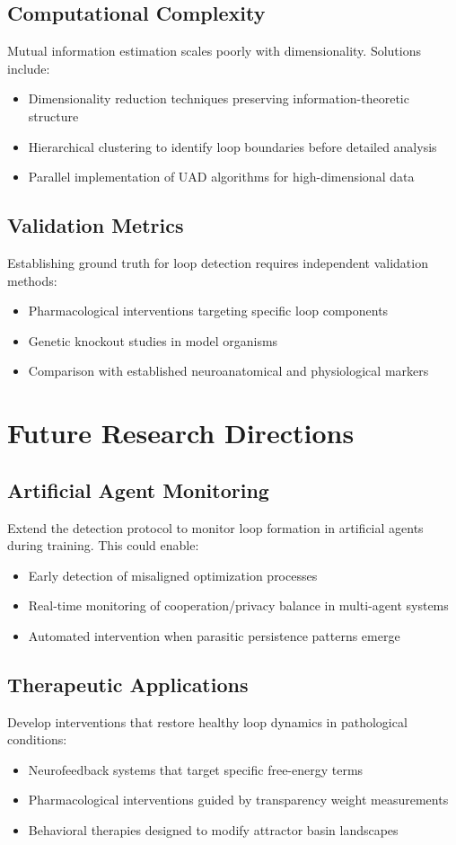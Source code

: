 \documentclass[10pt,conference]{IEEEtran}
\begin{document}
\subsection{Computational Complexity}
Mutual information estimation scales poorly with dimensionality. Solutions include:
\begin{itemize}
\item Dimensionality reduction techniques preserving information-theoretic structure
\item Hierarchical clustering to identify loop boundaries before detailed analysis
\item Parallel implementation of UAD algorithms for high-dimensional data
\end{itemize}

\subsection{Validation Metrics}
Establishing ground truth for loop detection requires independent validation methods:
\begin{itemize}
\item Pharmacological interventions targeting specific loop components
\item Genetic knockout studies in model organisms
\item Comparison with established neuroanatomical and physiological markers
\end{itemize}

\section{Future Research Directions}

\subsection{Artificial Agent Monitoring}
Extend the detection protocol to monitor loop formation in artificial agents during training. This could enable:
\begin{itemize}
\item Early detection of misaligned optimization processes
\item Real-time monitoring of cooperation/privacy balance in multi-agent systems
\item Automated intervention when parasitic persistence patterns emerge
\end{itemize}

\subsection{Therapeutic Applications}
Develop interventions that restore healthy loop dynamics in pathological conditions:
\begin{itemize}
\item Neurofeedback systems that target specific free-energy terms
\item Pharmacological interventions guided by transparency weight measurements
\item Behavioral therapies designed to modify attractor basin landscapes
\end{itemize}
\end{document}
